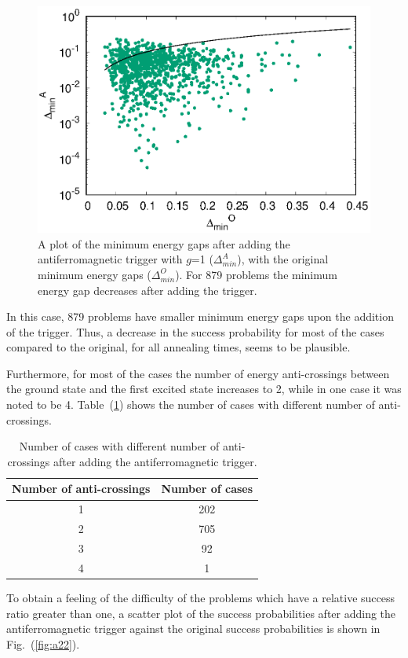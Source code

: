 \documentclass[../main.tex]{subfiles}
\begin{document}
\begin{figure}
\centering 
\includegraphics[scale=0.8]{MinGap_A_g1.eps}
\caption{A plot of the minimum energy gaps after adding the antiferromagnetic trigger with $g$=1 ($\Delta_{min}^A$), with the original minimum energy gaps ($\Delta_{min}^O$). For 879 problems the minimum energy gap decreases after adding the trigger.}
\label{fig:a21}
\end{figure}
In this case, 879 problems have smaller minimum energy gaps upon the addition of the trigger. Thus, a decrease in the success probability for most of the cases compared to the original, for all annealing times, seems to be plausible.

Furthermore, for most of the cases the number of energy anti-crossings between the ground state and the first excited state increases to 2, while in one case it was noted to be 4. Table~(\ref{tab:a4}) shows the number of cases with different number of anti-crossings.

\begin{table}[H]
\centering
\renewcommand{\arraystretch}{1.5}
\begin{tabular}{|c|c|}
\hline 
Number of anti-crossings & Number of cases  \\ 
\hline 
1 & 202 \\ 
\hline 
2 & 705 \\ 
\hline 
3 & 92 \\ 
\hline 
4 & 1 \\ 
\hline 
\end{tabular} 
\caption{Number of cases with different number of anti-crossings after adding the antiferromagnetic trigger.}
\label{tab:a4}

\end{table}
To obtain a feeling of the difficulty of the problems which have a relative success ratio greater than one, a scatter plot of the success probabilities after adding the antiferromagnetic trigger against the original success probabilities is shown in Fig.~(\ref{fig:a22}).
\end{document}
